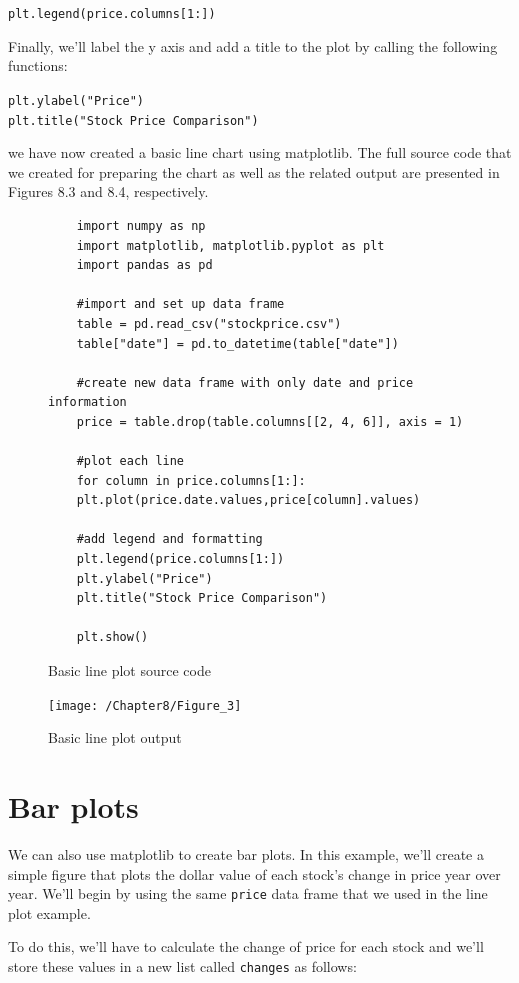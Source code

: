 \documentclass{book}
\begin{document}
\texttt{plt.legend(price.columns[1:])}

Finally, we'll label the y axis and add a title to the plot by calling the following functions:

\texttt{plt.ylabel("Price")\\plt.title("Stock Price Comparison")}

we have now created a basic line chart using matplotlib. The full source code that we created for preparing the chart as well as the related output are presented in Figures 8.3 and 8.4, respectively.

\begin{figure}[h]
	\caption{Basic line plot source code}
	\begin{lstlisting}
	import numpy as np
	import matplotlib, matplotlib.pyplot as plt
	import pandas as pd
	
	#import and set up data frame
	table = pd.read_csv("stockprice.csv")
	table["date"] = pd.to_datetime(table["date"])
	
	#create new data frame with only date and price information
	price = table.drop(table.columns[[2, 4, 6]], axis = 1)
	
	#plot each line
	for column in price.columns[1:]:
	plt.plot(price.date.values,price[column].values)
	
	#add legend and formatting
	plt.legend(price.columns[1:])
	plt.ylabel("Price")
	plt.title("Stock Price Comparison")
	
	plt.show()
	\end{lstlisting}
\end{figure}

\begin{figure}[h]
	\caption{Basic line plot output}
	\centering\texttt{[image: /Chapter8/Figure\_3]}
\end{figure}

\section{Bar plots}

We can also use matplotlib to create bar plots. In this example, we'll create a simple figure that plots the dollar value of each stock's change in price year over year. We'll begin by using the same \texttt{price} data frame that we used in the line plot example. 

To do this, we'll have to calculate the change of price for each stock and we'll store these values in a new list called \texttt{changes} as follows:
\end{document}
